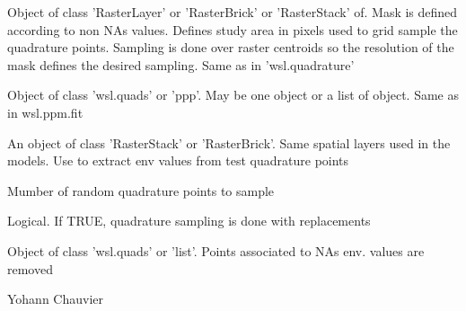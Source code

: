\documentclass[a4paper]{book}
\begin{document}
\begin{Arguments}
\begin{ldescription}
\item[\code{mask}] Object of class 'RasterLayer' or 'RasterBrick' or 'RasterStack' of. Mask is defined
according to non NAs values. Defines study area in pixels used to grid sample the quadrature points.
Sampling is done over raster centroids so the resolution of the mask defines the desired sampling.
Same as in 'wsl.quadrature'

\item[\code{quadrature}] Object of class 'wsl.quads' or 'ppp'. May be one object or a list of object.
Same as in wsl.ppm.fit

\item[\code{env\_vars}] An object of class 'RasterStack' or 'RasterBrick'. Same spatial layers used in
the models. Use to extract env values from test quadrature points

\item[\code{nQ}] Mumber of random quadrature points to sample

\item[\code{replace}] Logical. If TRUE, quadrature sampling is done with replacements
\end{ldescription}
\end{Arguments}
%
\begin{Value}
Object of class 'wsl.quads' or 'list'. Points associated to NAs env. values are removed
\end{Value}
%
\begin{Author}\relax
Yohann Chauvier
\end{Author}
%
\end{document}
